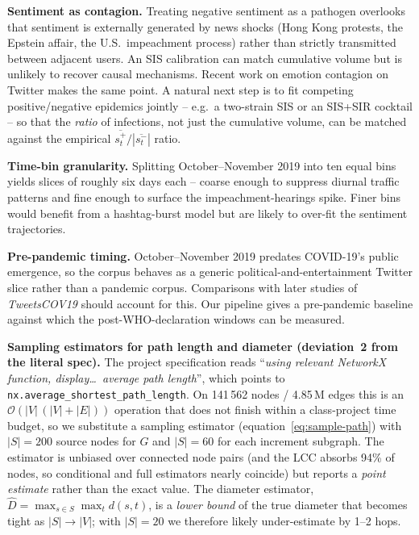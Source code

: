 \documentclass[conference]{IEEEtran}
\begin{document}
\textbf{Sentiment as contagion.}  Treating negative
sentiment as a pathogen overlooks that sentiment is
externally generated by news shocks (Hong Kong protests, the
Epstein affair, the U.S.\ impeachment process) rather than
strictly transmitted between adjacent users.  An SIS
calibration can match cumulative volume but is unlikely to
recover causal mechanisms.  Recent work on emotion contagion
on Twitter
\cite{ferrara2015measuring,delvicario2016spreading}
makes the same point.  A natural next step is to fit
competing positive/negative epidemics jointly -- e.g.\ a
two-strain SIS or an SIS+SIR cocktail -- so that the
\emph{ratio} of infections, not just the cumulative volume,
can be matched against the empirical
$\overline{s^{+}_{t}} / |\overline{s^{-}_{t}}|$ ratio.

\textbf{Time-bin granularity.}  Splitting October--November
2019 into ten equal bins yields slices of roughly six days
each -- coarse enough to suppress diurnal traffic patterns and
fine enough to surface the impeachment-hearings spike.  Finer
bins would benefit from a hashtag-burst model
\cite{kleinberg2003bursty} but are likely to over-fit the
sentiment trajectories.

\textbf{Pre-pandemic timing.}  October--November 2019 predates
COVID-19's public emergence, so the corpus behaves as a generic
political-and-entertainment Twitter slice rather than a pandemic
corpus.  Comparisons with later studies of \textit{TweetsCOV19}
should account for this.  Our pipeline gives a pre-pandemic
baseline against which the post-WHO-declaration windows can be
measured.

\textbf{Sampling estimators for path length and diameter
(deviation~2 from the literal spec).}
The project specification reads ``\textit{using relevant
NetworkX function, display\ldots\ average path length}'', which
points to \texttt{nx.average\_shortest\_path\_length}.  On
141\,562 nodes / 4.85\,M edges this is an
$\mathcal{O}(|V|\,(|V|+|E|))$ operation that does not finish
within a class-project time budget, so we substitute a
sampling estimator (equation~\ref{eq:sample-path}) with
$|S|=200$ source nodes for $G$ and $|S|=60$ for each
increment subgraph.  The estimator is unbiased over
connected node pairs (and the LCC absorbs 94\% of nodes, so
conditional and full estimators nearly coincide) but reports
a \emph{point estimate} rather than the exact value.  The
diameter estimator,
$\hat{D} = \max_{s \in S} \max_{t} d(s,t)$, is a
\emph{lower bound} of the true diameter that becomes tight
as $|S| \to |V|$; with $|S|=20$ we therefore likely
under-estimate by 1--2 hops.
\end{document}

